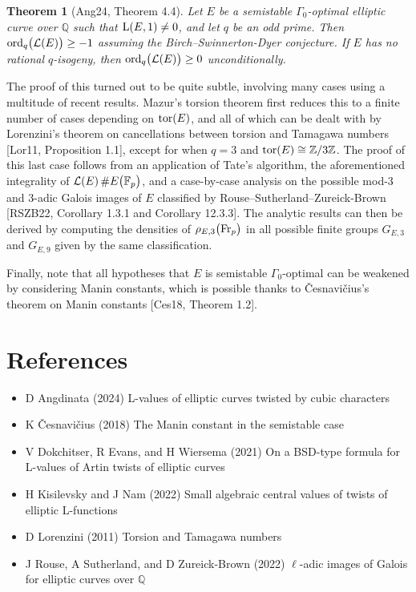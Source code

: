 \documentclass{article}
\theoremstyle{plain}
\newtheorem*{theorem}{Theorem}
\theoremstyle{definition}
\newcommand{\FF}{\mathbb{F}}
\newcommand{\Fr}{\mathrm{Fr}}
\renewcommand{\L}{\mathrm{L}}
\newcommand{\LLL}{\mathcal{L}}
\newcommand{\ord}{\mathrm{ord}}
\newcommand{\QQ}{\mathbb{Q}}
\newcommand{\tor}{\mathrm{tor}}
\newcommand{\ZZ}{\mathbb{Z}}
\newcommand{\br}{\!\del}
\begin{document}
\begin{theorem}[Ang24, Theorem 4.4]
Let $ E $ be a semistable $ \Gamma_0 $-optimal elliptic curve over $ \QQ $ such that $ \L\br{E, 1} \ne 0 $, and let $ q $ be an odd prime. Then $ \ord_q\br{\LLL\br{E}} \ge -1 $ assuming the Birch--Swinnerton-Dyer conjecture. If $ E $ has no rational $ q $-isogeny, then $ \ord_q\br{\LLL\br{E}} \ge 0 $ unconditionally.
\end{theorem}

The proof of this turned out to be quite subtle, involving many cases using a multitude of recent results. Mazur's torsion theorem first reduces this to a finite number of cases depending on $ \tor\br{E} $, and all of which can be dealt with by Lorenzini's theorem on cancellations between torsion and Tamagawa numbers [Lor11, Proposition 1.1], except for when $ q = 3 $ and $ \tor\br{E} \cong \ZZ / 3\ZZ $. The proof of this last case follows from an application of Tate's algorithm, the aforementioned integrality of $ \LLL\br{E}\#E\br{\FF_p} $, and a case-by-case analysis on the possible mod-$ 3 $ and $ 3 $-adic Galois images of $ E $ classified by Rouse--Sutherland--Zureick-Brown [RSZB22, Corollary 1.3.1 and Corollary 12.3.3]. The analytic results can then be derived by computing the densities of $ \rho_{E, 3}\br{\Fr_p} $ in all possible finite groups $ G_{E, 3} $ and $ G_{E, 9} $ given by the same classification.

Finally, note that all hypotheses that $ E $ is semistable $ \Gamma_0 $-optimal can be weakened by considering Manin constants, which is possible thanks to \v Cesnavi\v cius's theorem on Manin constants [Ces18, Theorem 1.2].

\section*{References}

\begin{itemize}
\item[Ang24] D Angdinata (2024) L-values of elliptic curves twisted by cubic characters
\item[Ces18] K \v Cesnavi\v cius (2018) The Manin constant in the semistable case
\item[DEW21] V Dokchitser, R Evans, and H Wiersema (2021) On a BSD-type formula for L-values
of Artin twists of elliptic curves
\item[KN22] H Kisilevsky and J Nam (2022) Small algebraic central values of twists of elliptic L-functions
\item[Lor11] D Lorenzini (2011) Torsion and Tamagawa numbers
\item[RSZB22] J Rouse, A Sutherland, and D Zureick-Brown (2022) $ \ell $-adic images of Galois for elliptic curves over $ \QQ $
\end{itemize}
\end{document}
